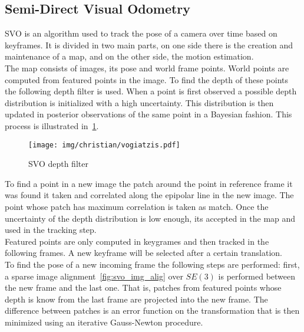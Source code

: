 \subsection{Semi-Direct Visual Odometry}
\label{ssub:semi_direct_visual_odometry}

SVO is an algorithm used to track the pose of a camera over time based on keyframes. It is divided in two main parts, on one side there is the creation and maintenance of a map, and on the other side, the motion estimation. \\

The map consists of images, its pose and world frame points. World points are computed from featured points in the image. To find the depth of these points the following depth filter is used. When a point is first observed a possible depth distribution is initialized with a high uncertainty. This distribution is then updated in posterior observations of the same point in a Bayesian fashion. This process is illustrated in~\ref{fig:depth_filter}.\\ 

\begin{figure}[htpb]
  \centering
  \texttt{[image: img/christian/vogiatzis.pdf]}
  \caption{SVO depth filter \cite{Forster2014}}
  \label{fig:depth_filter}
\end{figure}

To find a point in a new image the patch around the point in reference frame it was found it taken and correlated along the epipolar line in the new image. The point whose patch has maximum correlation is taken as match. Once the uncertainty of the depth distribution is low enough, its accepted in the map and used in the tracking step.\\

Featured points are only computed in keygrames and then tracked in the following frames. A new keyframe will be selected after a certain translation.\\

To find the pose of a new incoming frame the following steps are performed: first, a sparse image alignment~\ref{fig:svo_img_alig} over $SE(3)$ is performed between the new frame and the last one. That is, patches from featured points whose depth is know from the last frame are projected into the new frame. The difference between patches is an error function on the transformation that is then minimized using an iterative Gauss-Newton procedure.\\

